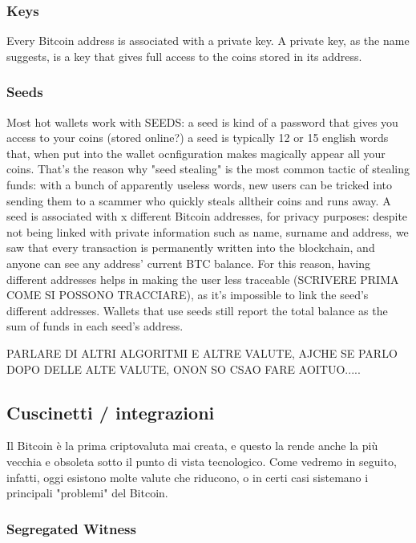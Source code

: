 \documentclass {article}
\begin{document}
\subsubsection {Keys}


Every Bitcoin address is associated with a private key.
A private key, as the name suggests, is a key that gives full access to the coins stored in its address.


\subsubsection {Seeds}


Most hot wallets work with SEEDS: a seed is kind of a password that gives you access to your coins (stored online?) a seed is typically 12 or 15 english words that, when put into the wallet ocnfiguration makes magically appear all your coins.
That's the reason why "seed stealing" is the most common tactic of stealing funds: with a bunch of apparently useless words, new users can be tricked into sending them to a scammer who quickly steals alltheir coins and runs away.
A seed is associated with x different Bitcoin addresses, for privacy purposes: despite not being linked with private information such as name, surname and address, we saw that every transaction is permanently written into the blockchain, and anyone can see any address' current BTC balance.
For this reason, having different addresses helps in making the user less traceable (SCRIVERE PRIMA COME SI POSSONO TRACCIARE), as it's impossible to link the seed's different addresses.
Wallets that use seeds still report the total balance as the sum of funds in each seed's address.


PARLARE DI ALTRI ALGORITMI E ALTRE VALUTE, AJCHE SE PARLO DOPO DELLE ALTE VALUTE, ONON SO CSAO FARE AOITUO.....


\subsection {Cuscinetti / integrazioni}


Il Bitcoin è la prima criptovaluta mai creata, e questo la rende anche la più vecchia e obsoleta sotto il punto di vista tecnologico. Come vedremo in seguito, infatti, oggi esistono molte valute che riducono, o in certi casi sistemano i principali "problemi" del Bitcoin.


\subsubsection {Segregated Witness}
\end{document}
